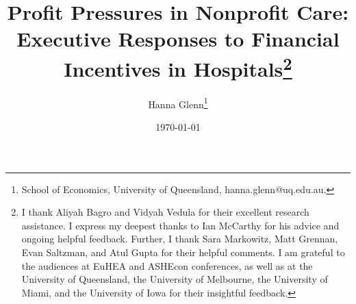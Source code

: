\documentclass[12pt]{article}
\begin{document}
	
	
	
	
	\linespread{1.2}\title{\vspace{-0.5in} Profit Pressures in Nonprofit Care:\\ \large Executive Responses to Financial Incentives in Hospitals\thanks{I thank Aliyah Bagro and Vidyah Vedula for their excellent research assistance. I express my deepest thanks to Ian McCarthy for his advice and ongoing helpful feedback. Further, I thank Sara Markowitz, Matt Grennan, Evan Saltzman, and Atul Gupta for their helpful comments. I am grateful to the audiences at EuHEA and ASHEcon conferences, as well as at the University of Queensland, the University of Melbourne, the University of Miami, and the University of Iowa for their insightful feedback.}} 
	
	\date{\today}
	
	\author{\vspace{10mm}Hanna Glenn\footnote{School of Economics, University of Queensland, hanna.glenn@uq.edu.au.}
    }
    
	
	\maketitle
	
	\vspace{-0.2in}
	
	\singlespacing\maketitle


 \vspace{3mm}
	
\end{document}
